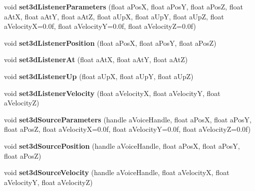 \begin{DoxyCompactItemize}
\item 
\mbox{\label{class_so_loud_1_1_soloud_a3f2bfc85ad456ba9987fdb6d2ea6497b}} 
void {\bfseries set3d\+Listener\+Parameters} (float a\+PosX, float a\+PosY, float a\+PosZ, float a\+AtX, float a\+AtY, float a\+AtZ, float a\+UpX, float a\+UpY, float a\+UpZ, float a\+VelocityX=0.\+0f, float a\+Velocity\+Y=0.\+0f, float a\+Velocity\+Z=0.\+0f)
\item 
\mbox{\label{class_so_loud_1_1_soloud_a2a26c92f8ba7b283da730d038ca07ab5}} 
void {\bfseries set3d\+Listener\+Position} (float a\+PosX, float a\+PosY, float a\+PosZ)
\item 
\mbox{\label{class_so_loud_1_1_soloud_aeb3d87e784043242e8a36003a1b5a1d5}} 
void {\bfseries set3d\+Listener\+At} (float a\+AtX, float a\+AtY, float a\+AtZ)
\item 
\mbox{\label{class_so_loud_1_1_soloud_a73d76cc9ab22a2179eb0f6b463b6744a}} 
void {\bfseries set3d\+Listener\+Up} (float a\+UpX, float a\+UpY, float a\+UpZ)
\item 
\mbox{\label{class_so_loud_1_1_soloud_acaa3d925bc946965e8320ad9b50ea34e}} 
void {\bfseries set3d\+Listener\+Velocity} (float a\+VelocityX, float a\+VelocityY, float a\+VelocityZ)
\item 
\mbox{\label{class_so_loud_1_1_soloud_a3be0dac0ceb4d9580fec048746ed789b}} 
void {\bfseries set3d\+Source\+Parameters} (handle a\+Voice\+Handle, float a\+PosX, float a\+PosY, float a\+PosZ, float a\+VelocityX=0.\+0f, float a\+Velocity\+Y=0.\+0f, float a\+Velocity\+Z=0.\+0f)
\item 
\mbox{\label{class_so_loud_1_1_soloud_ac1f8eeab636353cccafdabf026495ccd}} 
void {\bfseries set3d\+Source\+Position} (handle a\+Voice\+Handle, float a\+PosX, float a\+PosY, float a\+PosZ)
\item 
\mbox{\label{class_so_loud_1_1_soloud_a367f584ad9e792a1042b1aa1ed02ad49}} 
void {\bfseries set3d\+Source\+Velocity} (handle a\+Voice\+Handle, float a\+VelocityX, float a\+VelocityY, float a\+VelocityZ)

\end{DoxyCompactItemize}

